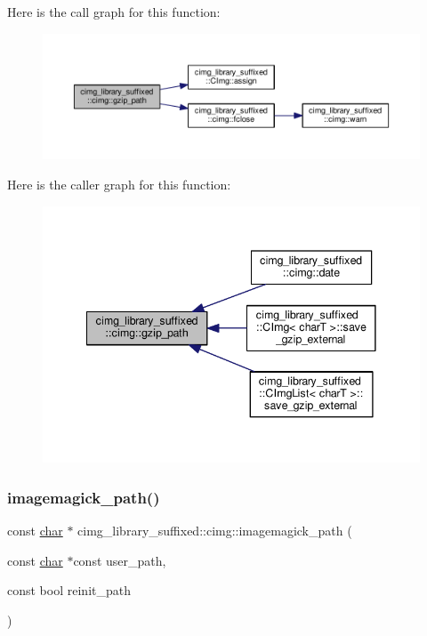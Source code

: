 Here is the call graph for this function\+:
\nopagebreak
\begin{figure}[H]
\begin{center}
\leavevmode
\includegraphics[width=350pt]{d4/d9b/namespacecimg__library__suffixed_1_1cimg_aac00308d827ccbd69bd26c9ba6e1356b_cgraph}
\end{center}
\end{figure}
Here is the caller graph for this function\+:
\nopagebreak
\begin{figure}[H]
\begin{center}
\leavevmode
\includegraphics[width=341pt]{d4/d9b/namespacecimg__library__suffixed_1_1cimg_aac00308d827ccbd69bd26c9ba6e1356b_icgraph}
\end{center}
\end{figure}
\mbox{\label{namespacecimg__library__suffixed_1_1cimg_a96cabeea0a54a10aeee97ead7b672f0f}} 
\subsubsection{\texorpdfstring{imagemagick\+\_\+path()}{imagemagick\_path()}}
{\footnotesize\ttfamily const \hyperlink{classchar}{char} $\ast$ cimg\+\_\+library\+\_\+suffixed\+::cimg\+::imagemagick\+\_\+path (\begin{DoxyParamCaption}\item[{const \hyperlink{classchar}{char} $\ast$const}]{user\+\_\+path,  }\item[{const bool}]{reinit\+\_\+path }\end{DoxyParamCaption})\hspace{0.3cm}{\ttfamily [inline]}}



